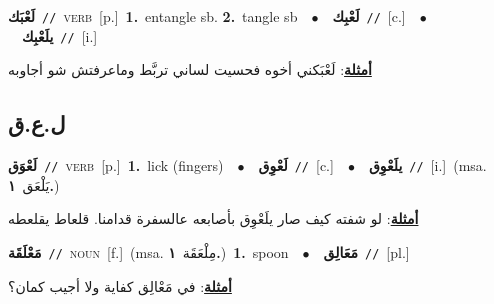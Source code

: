 \documentclass[10pt,a4paper,twoside]{article} %
\begin{document}
\begin{multicols}{2}
{\setlength\topsep{0pt}\textbf{\foreignlanguage{arabic}{لَعْبَك}}\ {\color{gray}\texttt{//}\color{black}}\ \textsc{verb}\ [p.]\ \textbf{1.}~entangle sb.  \textbf{2.}~tangle sb\ \ $\bullet$\ \ \setlength\topsep{0pt}\textbf{\foreignlanguage{arabic}{لَعْبِك}}\ {\color{gray}\texttt{//}\color{black}}\ [c.]\ \ $\bullet$\ \ \setlength\topsep{0pt}\textbf{\foreignlanguage{arabic}{يلَعْبِك}}\ {\color{gray}\texttt{//}\color{black}}\ [i.]\  \begin{flushright}\color{gray}\foreignlanguage{arabic}{\textbf{\underline{\foreignlanguage{arabic}{أمثلة}}}: لَعْبَكني أخوه فحسيت لساني تربَّط وماعرفتش شو أجاوبه}\end{flushright}\color{black}} \vspace{2mm}

\vspace{-3mm}
\subsection*{\color{blue}\foreignlanguage{arabic}{ل.ع.ق}\color{blue}{}} 

{\setlength\topsep{0pt}\textbf{\foreignlanguage{arabic}{لَعْوَق}}\ {\color{gray}\texttt{//}\color{black}}\ \textsc{verb}\ [p.]\ \textbf{1.}~lick (fingers)\ \ $\bullet$\ \ \setlength\topsep{0pt}\textbf{\foreignlanguage{arabic}{لَعْوِق}}\ {\color{gray}\texttt{//}\color{black}}\ [c.]\ \ $\bullet$\ \ \setlength\topsep{0pt}\textbf{\foreignlanguage{arabic}{يلَعْوِق}}\ {\color{gray}\texttt{//}\color{black}}\ [i.]\ \color{gray}(msa. \foreignlanguage{arabic}{يَلْعَق}~\foreignlanguage{arabic}{\textbf{١.}})\color{black}\  \begin{flushright}\color{gray}\foreignlanguage{arabic}{\textbf{\underline{\foreignlanguage{arabic}{أمثلة}}}: لو شفته كيف صار يلَعْوِق بأصابعه عالسفرة قدامنا. قلعاط يقلعطه}\end{flushright}\color{black}} \vspace{2mm}

{\setlength\topsep{0pt}\textbf{\foreignlanguage{arabic}{مَعْلَقَة}}\ {\color{gray}\texttt{//}\color{black}}\ \textsc{noun}\ [f.]\ \color{gray}(msa. \foreignlanguage{arabic}{مِلْعَقَة}~\foreignlanguage{arabic}{\textbf{١.}})\color{black}\ \textbf{1.}~spoon\ \ $\bullet$\ \ \setlength\topsep{0pt}\textbf{\foreignlanguage{arabic}{مَعَالِق}}\ {\color{gray}\texttt{//}\color{black}}\ [pl.]\  \begin{flushright}\color{gray}\foreignlanguage{arabic}{\textbf{\underline{\foreignlanguage{arabic}{أمثلة}}}: في مَعْالِق كفاية ولا أجيب كمان؟}\end{flushright}\color{black}} \vspace{2mm}


\end{multicols}
\end{document}
